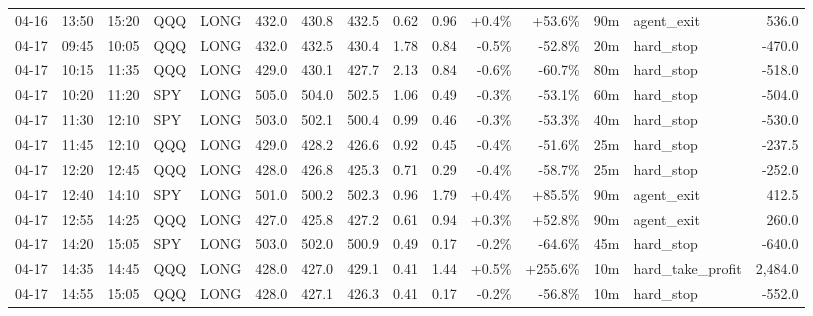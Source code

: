 \documentclass[11pt,a4paper,twoside]{article}
\begin{document}
\begin{landscape}
\begin{center}
\begin{longtable}{>{\color{txtmain}}l l l l l r r r r r r r r >{\color{txtmain}}l r}
04-16 & 13:50 & 15:20 & QQQ & LONG & 432.0 & 430.8 & 432.5 & 0.62 & 0.96 & \textcolor{wingreen}{+0.4\%} & \textcolor{wingreen}{+53.6\%} & 90m & agent\_exit & \textcolor{wingreen}{536.0} \\
04-17 & 09:45 & 10:05 & QQQ & LONG & 432.0 & 432.5 & 430.4 & 1.78 & 0.84 & \textcolor{lossred}{-0.5\%} & \textcolor{lossred}{-52.8\%} & 20m & hard\_stop & \textcolor{lossred}{-470.0} \\
04-17 & 10:15 & 11:35 & QQQ & LONG & 429.0 & 430.1 & 427.7 & 2.13 & 0.84 & \textcolor{lossred}{-0.6\%} & \textcolor{lossred}{-60.7\%} & 80m & hard\_stop & \textcolor{lossred}{-518.0} \\
04-17 & 10:20 & 11:20 & SPY & LONG & 505.0 & 504.0 & 502.5 & 1.06 & 0.49 & \textcolor{lossred}{-0.3\%} & \textcolor{lossred}{-53.1\%} & 60m & hard\_stop & \textcolor{lossred}{-504.0} \\
04-17 & 11:30 & 12:10 & SPY & LONG & 503.0 & 502.1 & 500.4 & 0.99 & 0.46 & \textcolor{lossred}{-0.3\%} & \textcolor{lossred}{-53.3\%} & 40m & hard\_stop & \textcolor{lossred}{-530.0} \\
04-17 & 11:45 & 12:10 & QQQ & LONG & 429.0 & 428.2 & 426.6 & 0.92 & 0.45 & \textcolor{lossred}{-0.4\%} & \textcolor{lossred}{-51.6\%} & 25m & hard\_stop & \textcolor{lossred}{-237.5} \\
04-17 & 12:20 & 12:45 & QQQ & LONG & 428.0 & 426.8 & 425.3 & 0.71 & 0.29 & \textcolor{lossred}{-0.4\%} & \textcolor{lossred}{-58.7\%} & 25m & hard\_stop & \textcolor{lossred}{-252.0} \\
04-17 & 12:40 & 14:10 & SPY & LONG & 501.0 & 500.2 & 502.3 & 0.96 & 1.79 & \textcolor{wingreen}{+0.4\%} & \textcolor{wingreen}{+85.5\%} & 90m & agent\_exit & \textcolor{wingreen}{412.5} \\
04-17 & 12:55 & 14:25 & QQQ & LONG & 427.0 & 425.8 & 427.2 & 0.61 & 0.94 & \textcolor{wingreen}{+0.3\%} & \textcolor{wingreen}{+52.8\%} & 90m & agent\_exit & \textcolor{wingreen}{260.0} \\
04-17 & 14:20 & 15:05 & SPY & LONG & 503.0 & 502.0 & 500.9 & 0.49 & 0.17 & \textcolor{lossred}{-0.2\%} & \textcolor{lossred}{-64.6\%} & 45m & hard\_stop & \textcolor{lossred}{-640.0} \\
04-17 & 14:35 & 14:45 & QQQ & LONG & 428.0 & 427.0 & 429.1 & 0.41 & 1.44 & \textcolor{wingreen}{+0.5\%} & \textcolor{wingreen}{+255.6\%} & 10m & hard\_take\_profit & \textcolor{wingreen}{2,484.0} \\
04-17 & 14:55 & 15:05 & QQQ & LONG & 428.0 & 427.1 & 426.3 & 0.41 & 0.17 & \textcolor{lossred}{-0.2\%} & \textcolor{lossred}{-56.8\%} & 10m & hard\_stop & \textcolor{lossred}{-552.0} \\

\end{longtable}
\end{center}
\end{landscape}
\end{document}
